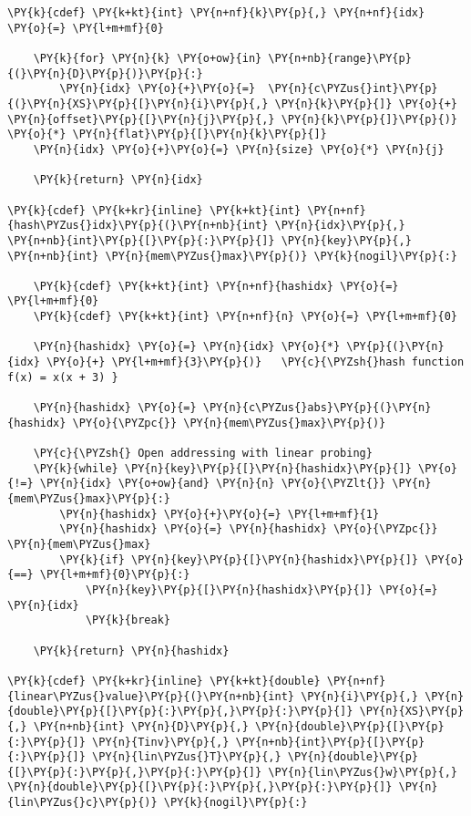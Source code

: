 \begin{Verbatim}[commandchars=\\\{\}]
    \PY{k}{cdef} \PY{k+kt}{int} \PY{n+nf}{k}\PY{p}{,} \PY{n+nf}{idx} \PY{o}{=} \PY{l+m+mf}{0}
    
    \PY{k}{for} \PY{n}{k} \PY{o+ow}{in} \PY{n+nb}{range}\PY{p}{(}\PY{n}{D}\PY{p}{)}\PY{p}{:}
        \PY{n}{idx} \PY{o}{+}\PY{o}{=}  \PY{n}{c\PYZus{}int}\PY{p}{(}\PY{n}{XS}\PY{p}{[}\PY{n}{i}\PY{p}{,} \PY{n}{k}\PY{p}{]} \PY{o}{+} \PY{n}{offset}\PY{p}{[}\PY{n}{j}\PY{p}{,} \PY{n}{k}\PY{p}{]}\PY{p}{)} \PY{o}{*} \PY{n}{flat}\PY{p}{[}\PY{n}{k}\PY{p}{]}
    \PY{n}{idx} \PY{o}{+}\PY{o}{=} \PY{n}{size} \PY{o}{*} \PY{n}{j}
    
    \PY{k}{return} \PY{n}{idx}

\PY{k}{cdef} \PY{k+kr}{inline} \PY{k+kt}{int} \PY{n+nf}{hash\PYZus{}idx}\PY{p}{(}\PY{n+nb}{int} \PY{n}{idx}\PY{p}{,} \PY{n+nb}{int}\PY{p}{[}\PY{p}{:}\PY{p}{]} \PY{n}{key}\PY{p}{,} \PY{n+nb}{int} \PY{n}{mem\PYZus{}max}\PY{p}{)} \PY{k}{nogil}\PY{p}{:}

    \PY{k}{cdef} \PY{k+kt}{int} \PY{n+nf}{hashidx} \PY{o}{=} \PY{l+m+mf}{0}
    \PY{k}{cdef} \PY{k+kt}{int} \PY{n+nf}{n} \PY{o}{=} \PY{l+m+mf}{0}

    \PY{n}{hashidx} \PY{o}{=} \PY{n}{idx} \PY{o}{*} \PY{p}{(}\PY{n}{idx} \PY{o}{+} \PY{l+m+mf}{3}\PY{p}{)}   \PY{c}{\PYZsh{}hash function f(x) = x(x + 3) }
    
    \PY{n}{hashidx} \PY{o}{=} \PY{n}{c\PYZus{}abs}\PY{p}{(}\PY{n}{hashidx} \PY{o}{\PYZpc{}} \PY{n}{mem\PYZus{}max}\PY{p}{)}

    \PY{c}{\PYZsh{} Open addressing with linear probing}
    \PY{k}{while} \PY{n}{key}\PY{p}{[}\PY{n}{hashidx}\PY{p}{]} \PY{o}{!=} \PY{n}{idx} \PY{o+ow}{and} \PY{n}{n} \PY{o}{\PYZlt{}} \PY{n}{mem\PYZus{}max}\PY{p}{:}
        \PY{n}{hashidx} \PY{o}{+}\PY{o}{=} \PY{l+m+mf}{1}
        \PY{n}{hashidx} \PY{o}{=} \PY{n}{hashidx} \PY{o}{\PYZpc{}} \PY{n}{mem\PYZus{}max}
        \PY{k}{if} \PY{n}{key}\PY{p}{[}\PY{n}{hashidx}\PY{p}{]} \PY{o}{==} \PY{l+m+mf}{0}\PY{p}{:}
            \PY{n}{key}\PY{p}{[}\PY{n}{hashidx}\PY{p}{]} \PY{o}{=} \PY{n}{idx}
            \PY{k}{break}

    \PY{k}{return} \PY{n}{hashidx}

\PY{k}{cdef} \PY{k+kr}{inline} \PY{k+kt}{double} \PY{n+nf}{linear\PYZus{}value}\PY{p}{(}\PY{n+nb}{int} \PY{n}{i}\PY{p}{,} \PY{n}{double}\PY{p}{[}\PY{p}{:}\PY{p}{,}\PY{p}{:}\PY{p}{]} \PY{n}{XS}\PY{p}{,} \PY{n+nb}{int} \PY{n}{D}\PY{p}{,} \PY{n}{double}\PY{p}{[}\PY{p}{:}\PY{p}{]} \PY{n}{Tinv}\PY{p}{,} \PY{n+nb}{int}\PY{p}{[}\PY{p}{:}\PY{p}{]} \PY{n}{lin\PYZus{}T}\PY{p}{,} \PY{n}{double}\PY{p}{[}\PY{p}{:}\PY{p}{,}\PY{p}{:}\PY{p}{]} \PY{n}{lin\PYZus{}w}\PY{p}{,} \PY{n}{double}\PY{p}{[}\PY{p}{:}\PY{p}{,}\PY{p}{:}\PY{p}{]} \PY{n}{lin\PYZus{}c}\PY{p}{)} \PY{k}{nogil}\PY{p}{:}


\end{Verbatim}
